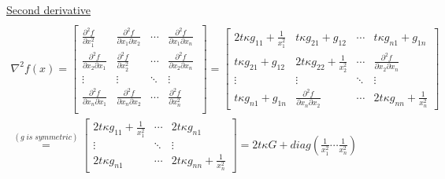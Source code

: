 \documentclass[fleqn]{article}
\begin{document}
\underline{Second derivative}\\
\begin{multline*} \\
\nabla^2 f(x) = \begin{bmatrix} 
\frac{\partial^2 f}{\partial x_1^2} & \frac{\partial^2 f}{\partial x_1 \partial x_2} & \cdots & \frac{\partial^2 f}{\partial x_1 \partial x_n}\
\\ 
\frac{\partial^2 f}{\partial x_2 \partial x_1} & \frac{\partial^2 f}{\partial x_2^2} & \cdots & \frac{\partial^2 f}{\partial x_2 \partial x_n}
\\ 
\vdots & \vdots & \ddots & \vdots
\\ 
\frac{\partial^2 f}{\partial x_n \partial x_1} & \frac{\partial^2 f}{\partial x_n \partial x_2} & \cdots & \frac{\partial^2 f}{\partial x_n^2}
\\ 
				\end{bmatrix}
=
\begin{bmatrix} 
	2t \kappa g_{11} + \frac{1}{x_1^2} &
	t \kappa g_{21} + g_{12}           & \cdots &
	t \kappa g_{n1} + g_{1n}
		\\ 
	t \kappa g_{21} + g_{12}           &
	2t \kappa g_{22} + \frac{1}{x_2^2} & \cdots &
	\frac{\partial^2 f}{\partial x_2 \partial 	x_n}
		\\ 
	\vdots & \vdots & \ddots & \vdots
	\\ 
	t \kappa g_{n1} + g_{1n} & \frac{\partial^2 f}		{\partial x_n \partial x_2} & \cdots & 2t \kappa g_{nn} + \frac{1}{x_n^2}
\end{bmatrix} \\
\stackrel{(g \; is \; symmetric)}{=}
\begin{bmatrix} 
	2t \kappa g_{11} + \frac{1}{x_1^2} & \cdots &
	2t \kappa g_{n1}
		\\ 
	\vdots &  \ddots & \vdots
		\\ 
	2t \kappa g_{n1} &  \cdots & 2t \kappa g_{nn} + \frac{1}{x_n^2}
\end{bmatrix}
=2t \kappa G + diag \left( \frac{1}{x_1^2} \cdots \frac{1}{x_n^2} \right)
\end{multline*} \\ \\
\end{document}
